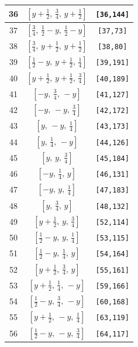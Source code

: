 \documentclass[fleqn,8pt]{jsarticle}
\begin{document}
\begin{longtable}{ccc}
36 & $\left[ y + \frac{1}{2},\, \frac{3}{4},\, y + \frac{1}{2} \right]$ & {\tt [36,144]} \\ \hline
37 & $\left[ \frac{3}{4},\, \frac{1}{2} - y,\, \frac{1}{2} - y \right]$ & {\tt [37,73]} \\ \hline
38 & $\left[ \frac{3}{4},\, y + \frac{1}{2},\, y + \frac{1}{2} \right]$ & {\tt [38,80]} \\ \hline
39 & $\left[ \frac{1}{2} - y,\, y + \frac{1}{2},\, \frac{1}{4} \right]$ & {\tt [39,191]} \\ \hline
40 & $\left[ y + \frac{1}{2},\, y + \frac{1}{2},\, \frac{3}{4} \right]$ & {\tt [40,189]} \\ \hline
41 & $\left[ - y,\, \frac{3}{4},\, - y \right]$ & {\tt [41,127]} \\ \hline
42 & $\left[ - y,\, - y,\, \frac{3}{4} \right]$ & {\tt [42,172]} \\ \hline
43 & $\left[ y,\, - y,\, \frac{1}{4} \right]$ & {\tt [43,173]} \\ \hline
44 & $\left[ y,\, \frac{1}{4},\, - y \right]$ & {\tt [44,126]} \\ \hline
45 & $\left[ y,\, y,\, \frac{3}{4} \right]$ & {\tt [45,184]} \\ \hline
46 & $\left[ - y,\, \frac{1}{4},\, y \right]$ & {\tt [46,131]} \\ \hline
47 & $\left[ - y,\, y,\, \frac{1}{4} \right]$ & {\tt [47,183]} \\ \hline
48 & $\left[ y,\, \frac{3}{4},\, y \right]$ & {\tt [48,132]} \\ \hline
49 & $\left[ y + \frac{1}{2},\, y,\, \frac{3}{4} \right]$ & {\tt [52,114]} \\ \hline
50 & $\left[ \frac{1}{2} - y,\, y,\, \frac{1}{4} \right]$ & {\tt [53,115]} \\ \hline
51 & $\left[ \frac{1}{2} - y,\, \frac{1}{4},\, y \right]$ & {\tt [54,164]} \\ \hline
52 & $\left[ y + \frac{1}{2},\, \frac{3}{4},\, y \right]$ & {\tt [55,161]} \\ \hline
53 & $\left[ y + \frac{1}{2},\, \frac{1}{4},\, - y \right]$ & {\tt [59,166]} \\ \hline
54 & $\left[ \frac{1}{2} - y,\, \frac{3}{4},\, - y \right]$ & {\tt [60,168]} \\ \hline
55 & $\left[ y + \frac{1}{2},\, - y,\, \frac{1}{4} \right]$ & {\tt [63,119]} \\ \hline
56 & $\left[ \frac{1}{2} - y,\, - y,\, \frac{3}{4} \right]$ & {\tt [64,117]} \\ \hline

\end{longtable}
\end{document}

